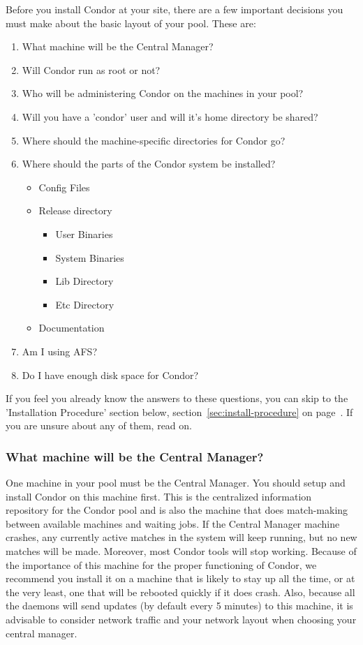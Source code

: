 Before you install Condor at your site, there are a few important
decisions you must make about the basic layout of your pool.  These
are:

\begin{enumerate}
\item What machine will be the Central Manager?
\item Will Condor run as root or not?
\item Who will be administering Condor on the machines in your pool?
\item Will you have a 'condor' user and will it's home directory be
   shared? 
\item Where should the machine-specific directories for Condor go?
\item Where should the parts of the Condor system be installed? 
	\begin{itemize}
	\item Config Files
	\item Release directory
		\begin{itemize}
		\item User Binaries
		\item System Binaries 
		\item Lib Directory
	  	\item Etc Directory
		\end{itemize}
	\item Documentation
	\end{itemize}
\item Am I using AFS?
\item Do I have enough disk space for Condor?
\end{enumerate}

If you feel you already know the answers to these questions, you can
skip to the 'Installation Procedure' section below,
section~\ref{sec:install-procedure} on
page~\pageref{sec:install-procedure}.
If you are unsure about any of them, read on.

\subsubsection{What machine will be the Central Manager?}

One machine in your pool must be the Central Manager.  You should
setup and install Condor on this machine first.  This is the
centralized information repository for the Condor pool and is also the
machine that does match-making between available machines and waiting
jobs.  If the Central Manager machine crashes, any currently active
matches in the system will keep running, but no new matches will be
made.  Moreover, most Condor tools will stop working.  Because of the
importance of this machine for the proper functioning of Condor, we
recommend you install it on a machine that is likely to stay up all the
time, or at the very least, one that will be rebooted quickly if it
does crash.  Also, because all the daemons will send updates (by
default every 5 minutes) to this machine, it is advisable to consider
network traffic and your network layout when choosing your central
manager.


